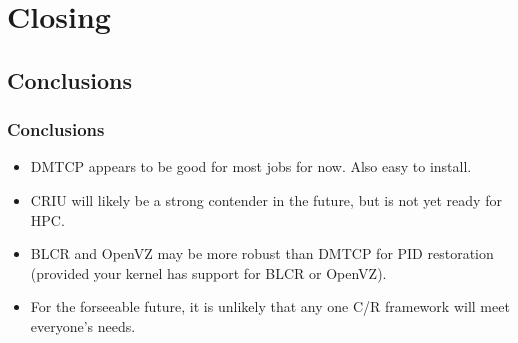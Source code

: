 \documentclass[compress]{beamer}
\begin{document}




\section{Closing}           %


\subsection{Conclusions}
\begin{frame}
\frametitle{Conclusions}

\begin{itemize}
\item DMTCP appears to be good for most jobs for now. Also easy to install.
\item CRIU will likely be a strong contender in the future, but is not
yet ready for HPC.
\item BLCR and OpenVZ may be more robust than DMTCP for PID restoration (provided
your kernel has support for BLCR or OpenVZ).
\item For the forseeable future, it is unlikely that any one C/R framework
will meet everyone's needs.


\end{itemize}

\end{frame}

\end{document}
